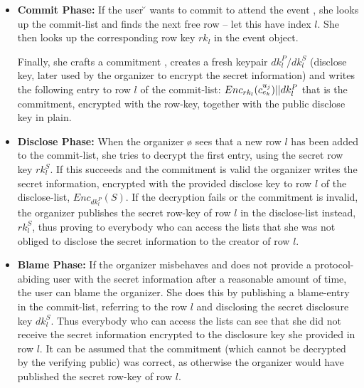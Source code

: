 \begin{itemize}
	\item \textbf{Commit Phase:}
		If the user \u{} wants to commit to attend the event \e{}, she
		looks up the commit-list and finds the next free row --
		let this have index $l$. She then looks up the corresponding row
		key $rk_l$ in the event object.
		
		Finally, she crafts a commitment \cm{}, creates a fresh keypair
		$dk_l^P/dk_l^S$ (disclose key, later used by the organizer to
		encrypt the secret information) and writes the following entry
		to row $l$ of the commit-list: $Enc_{rk_l}(\cm{}) || dk_l^P$
		that is the commitment, encrypted with the row-key, together
		with the public disclose key in plain.
		\\
	\item \textbf{Disclose Phase:}
		When the organizer \o{} sees that a new row $l$ has been added to the
		commit-list, she tries to decrypt the first entry, using the secret row
		key $rk_l^S$. If this succeeds and the commitment is valid %
		the organizer writes the secret information, encrypted with the provided 
		disclose key to row $l$ of the disclose-list, \ie $Enc_{dk_l^P}(S)$.
		If the decryption fails or the commitment is invalid, the
		organizer publishes the secret row-key of row $l$ in the
		disclose-list instead, \ie $rk_l^S$, 
		thus proving to everybody who can access the lists that she was not
		obliged to disclose the secret information to the creator of row $l$. %
		\\
	\item \textbf{Blame Phase:}
		If the organizer misbehaves and does not provide a
		protocol-abiding user with the secret information after a
		reasonable amount of time, %
		the user can blame the organizer. She does this by publishing a
		blame-entry in the commit-list, referring to the row $l$ and
		disclosing the secret disclosure key $dk_l^S$. Thus everybody 
		who can access the lists can see that she did not receive the
		secret information encrypted to the disclosure key she provided
		in row $l$. It can be assumed that the commitment (which cannot be
		decrypted by the verifying public) was correct, as otherwise the
		organizer would have published the secret row-key of row $l$.
\end{itemize}

